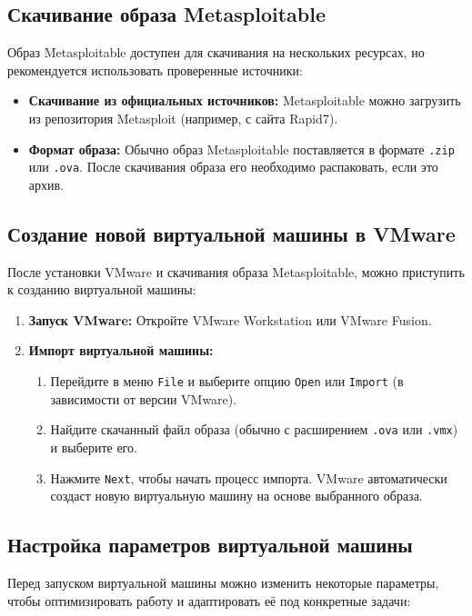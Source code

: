 \subsection{Скачивание образа Metasploitable}

Образ Metasploitable доступен для скачивания на нескольких ресурсах, но рекомендуется использовать проверенные источники:

\begin{itemize}
	\item \textbf{Скачивание из официальных источников:} Metasploitable можно загрузить из репозитория Metasploit (например, с сайта Rapid7).
	\item \textbf{Формат образа:} Обычно образ Metasploitable поставляется в формате \texttt{.zip} или \texttt{.ova}. После скачивания образа его необходимо распаковать, если это архив.
\end{itemize}

\subsection{Создание новой виртуальной машины в VMware}

После установки VMware и скачивания образа Metasploitable, можно приступить к созданию виртуальной машины:

\begin{enumerate}
	\item \textbf{Запуск VMware:} Откройте VMware Workstation или VMware Fusion.
	\item \textbf{Импорт виртуальной машины:}
	\begin{enumerate}
		\item Перейдите в меню \texttt{File} и выберите опцию \texttt{Open} или \texttt{Import} (в зависимости от версии VMware).
		\item Найдите скачанный файл образа (обычно с расширением \texttt{.ova} или \texttt{.vmx}) и выберите его.
		\item Нажмите \texttt{Next}, чтобы начать процесс импорта. VMware автоматически создаст новую виртуальную машину на основе выбранного образа.
	\end{enumerate}
\end{enumerate}

\subsection{Настройка параметров виртуальной машины}

Перед запуском виртуальной машины можно изменить некоторые параметры, чтобы оптимизировать работу и адаптировать её под конкретные задачи:

